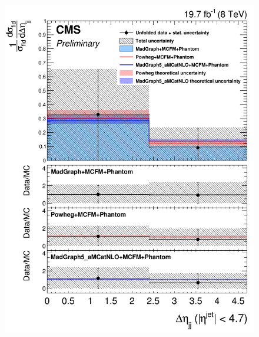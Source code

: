 \begin{figure}[hbtp]
\begin{center}
    \includegraphics[width=\cmsFigWidth]{Figures/DiffCrossSecZZTo2e2mDeta_Unfolded_fr_MadGraph_norm.png} 

\end{center}
\end{figure}
